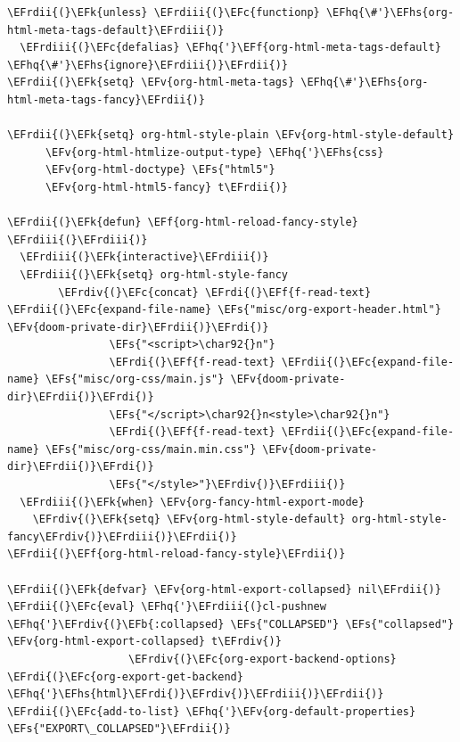 \documentclass{scrartcl}
\newcommand{\EFk}[1]{\textcolor{EFk}{#1}} %
\newcommand{\EFs}[1]{\textcolor{EFs}{#1}} %
\newcommand{\EFb}[1]{\textcolor{EFb}{#1}} %
\newcommand{\EFc}[1]{\textcolor{EFc}{#1}} %
\newcommand{\EFv}[1]{\textcolor{EFv}{#1}} %
\newcommand{\EFf}[1]{\textcolor{EFf}{#1}} %
\newcommand{\EFhq}[1]{\textcolor{EFhq}{#1}} %
\newcommand{\EFhs}[1]{\textcolor{EFhs}{#1}} %
\newcommand{\EFrdi}[1]{\textcolor{EFrdi}{#1}} %
\newcommand{\EFrdii}[1]{\textcolor{EFrdii}{#1}} %
\newcommand{\EFrdiii}[1]{\textcolor{EFrdiii}{#1}} %
\newcommand{\EFrdiv}[1]{\textcolor{EFrdiv}{#1}} %
\begin{document}
\begin{Code}
\begin{Verbatim}[]
\EFrdii{(}\EFk{unless} \EFrdiii{(}\EFc{functionp} \EFhq{\#'}\EFhs{org-html-meta-tags-default}\EFrdiii{)}
  \EFrdiii{(}\EFc{defalias} \EFhq{'}\EFf{org-html-meta-tags-default} \EFhq{\#'}\EFhs{ignore}\EFrdiii{)}\EFrdii{)}
\EFrdii{(}\EFk{setq} \EFv{org-html-meta-tags} \EFhq{\#'}\EFhs{org-html-meta-tags-fancy}\EFrdii{)}

\EFrdii{(}\EFk{setq} org-html-style-plain \EFv{org-html-style-default}
      \EFv{org-html-htmlize-output-type} \EFhq{'}\EFhs{css}
      \EFv{org-html-doctype} \EFs{"html5"}
      \EFv{org-html-html5-fancy} t\EFrdii{)}

\EFrdii{(}\EFk{defun} \EFf{org-html-reload-fancy-style} \EFrdiii{(}\EFrdiii{)}
  \EFrdiii{(}\EFk{interactive}\EFrdiii{)}
  \EFrdiii{(}\EFk{setq} org-html-style-fancy
        \EFrdiv{(}\EFc{concat} \EFrdi{(}\EFf{f-read-text} \EFrdii{(}\EFc{expand-file-name} \EFs{"misc/org-export-header.html"} \EFv{doom-private-dir}\EFrdii{)}\EFrdi{)}
                \EFs{"<script>\char92{}n"}
                \EFrdi{(}\EFf{f-read-text} \EFrdii{(}\EFc{expand-file-name} \EFs{"misc/org-css/main.js"} \EFv{doom-private-dir}\EFrdii{)}\EFrdi{)}
                \EFs{"</script>\char92{}n<style>\char92{}n"}
                \EFrdi{(}\EFf{f-read-text} \EFrdii{(}\EFc{expand-file-name} \EFs{"misc/org-css/main.min.css"} \EFv{doom-private-dir}\EFrdii{)}\EFrdi{)}
                \EFs{"</style>"}\EFrdiv{)}\EFrdiii{)}
  \EFrdiii{(}\EFk{when} \EFv{org-fancy-html-export-mode}
    \EFrdiv{(}\EFk{setq} \EFv{org-html-style-default} org-html-style-fancy\EFrdiv{)}\EFrdiii{)}\EFrdii{)}
\EFrdii{(}\EFf{org-html-reload-fancy-style}\EFrdii{)}

\EFrdii{(}\EFk{defvar} \EFv{org-html-export-collapsed} nil\EFrdii{)}
\EFrdii{(}\EFc{eval} \EFhq{'}\EFrdiii{(}cl-pushnew \EFhq{'}\EFrdiv{(}\EFb{:collapsed} \EFs{"COLLAPSED"} \EFs{"collapsed"} \EFv{org-html-export-collapsed} t\EFrdiv{)}
                   \EFrdiv{(}\EFc{org-export-backend-options} \EFrdi{(}\EFc{org-export-get-backend} \EFhq{'}\EFhs{html}\EFrdi{)}\EFrdiv{)}\EFrdiii{)}\EFrdii{)}
\EFrdii{(}\EFc{add-to-list} \EFhq{'}\EFv{org-default-properties} \EFs{"EXPORT\_COLLAPSED"}\EFrdii{)}


\end{Verbatim}
\end{Code}
\end{document}
